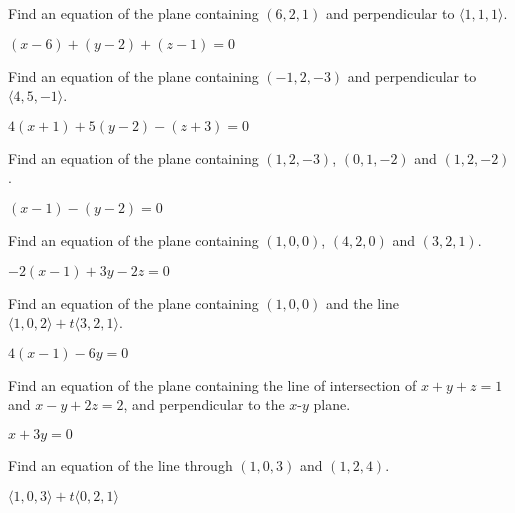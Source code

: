 \begin{exercises}

\begin{exercise} Find an equation of the plane containing $(6,2,1)$ and
perpendicular to $\langle 1,1,1\rangle$.
\begin{answer} $(x-6)+(y-2)+(z-1)=0$
\end{answer}\end{exercise}

\begin{exercise} Find an equation of the plane containing $(-1,2,-3)$ and
perpendicular to $\langle 4,5,-1\rangle$.
\begin{answer} $4(x+1)+5(y-2)-(z+3)=0$
\end{answer}\end{exercise}

\begin{exercise} Find an equation of the plane containing $(1,2,-3)$,
$(0,1,-2)$ and $(1,2,-2)$.
\begin{answer} $(x-1)-(y-2)=0$
\end{answer}\end{exercise}

\begin{exercise} Find an equation of the plane containing $(1,0,0)$,
$(4,2,0)$ and $(3,2,1)$.
\begin{answer} $-2(x-1)+3y-2z=0$
\end{answer}\end{exercise}

\begin{exercise} Find an equation of the plane containing $(1,0,0)$ and the
line $\langle 1,0,2\rangle + t\langle 3,2,1\rangle$.
\begin{answer} $4(x-1)-6y = 0$
\end{answer}\end{exercise}

\begin{exercise} Find an equation of the plane containing the line of
intersection of $x+y+z=1$ and $x-y+2z=2$, and perpendicular to the
$x$-$y$ plane.
\begin{answer} $x+3y=0$
\end{answer}\end{exercise}

\begin{exercise} Find an equation of the line through $(1,0,3)$ and 
$(1,2,4)$.
\begin{answer} $\langle 1,0,3\rangle+t\langle 0,2,1\rangle$
\end{answer}\end{exercise}


\end{exercises}
